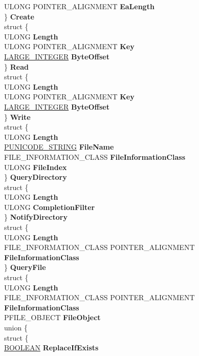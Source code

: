 \begin{DoxyCompactItemize}
\begin{tabbing}
\>\>ULONG POINTER\_ALIGNMENT {\bfseries EaLength}\\
\>\} {\bfseries Create}\\
\>struct \{\\
\>\>ULONG {\bfseries Length}\\
\>\>ULONG POINTER\_ALIGNMENT {\bfseries Key}\\
\>\>\hyperlink{union___l_a_r_g_e___i_n_t_e_g_e_r}{LARGE\_INTEGER} {\bfseries ByteOffset}\\
\>\} {\bfseries Read}\\
\>struct \{\\
\>\>ULONG {\bfseries Length}\\
\>\>ULONG POINTER\_ALIGNMENT {\bfseries Key}\\
\>\>\hyperlink{union___l_a_r_g_e___i_n_t_e_g_e_r}{LARGE\_INTEGER} {\bfseries ByteOffset}\\
\>\} {\bfseries Write}\\
\>struct \{\\
\>\>ULONG {\bfseries Length}\\
\>\>\hyperlink{struct___u_n_i_c_o_d_e___s_t_r_i_n_g}{PUNICODE\_STRING} {\bfseries FileName}\\
\>\>FILE\_INFORMATION\_CLASS {\bfseries FileInformationClass}\\
\>\>ULONG {\bfseries FileIndex}\\
\>\} {\bfseries QueryDirectory}\\
\>struct \{\\
\>\>ULONG {\bfseries Length}\\
\>\>ULONG {\bfseries CompletionFilter}\\
\>\} {\bfseries NotifyDirectory}\\
\>struct \{\\
\>\>ULONG {\bfseries Length}\\
\>\>FILE\_INFORMATION\_CLASS POINTER\_ALIGNMENT {\bfseries FileInformationClass}\\
\>\} {\bfseries QueryFile}\\
\>struct \{\\
\>\>ULONG {\bfseries Length}\\
\>\>FILE\_INFORMATION\_CLASS POINTER\_ALIGNMENT {\bfseries FileInformationClass}\\
\>\>PFILE\_OBJECT {\bfseries FileObject}\\
\>\>union \{\\
\>\>\>struct \{\\
\>\>\>\>\hyperlink{_processor_bind_8h_a112e3146cb38b6ee95e64d85842e380a}{BOOLEAN} {\bfseries ReplaceIfExists}\\

\end{tabbing}
\end{DoxyCompactItemize}
